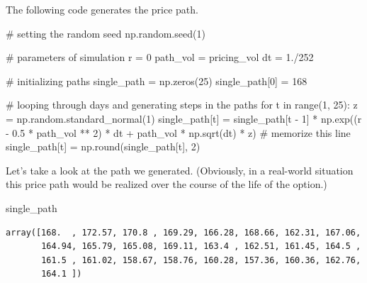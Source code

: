 \documentclass[
  letterpaper,
  DIV=11,
  numbers=noendperiod]{scrreprt}
\newenvironment{Shaded}{\begin{snugshade}}{\end{snugshade}}
\newcommand{\BuiltInTok}[1]{\textcolor[rgb]{0.00,0.23,0.31}{#1}}
\newcommand{\CommentTok}[1]{\textcolor[rgb]{0.37,0.37,0.37}{#1}}
\newcommand{\ControlFlowTok}[1]{\textcolor[rgb]{0.00,0.23,0.31}{#1}}
\newcommand{\DecValTok}[1]{\textcolor[rgb]{0.68,0.00,0.00}{#1}}
\newcommand{\FloatTok}[1]{\textcolor[rgb]{0.68,0.00,0.00}{#1}}
\newcommand{\KeywordTok}[1]{\textcolor[rgb]{0.00,0.23,0.31}{#1}}
\newcommand{\NormalTok}[1]{\textcolor[rgb]{0.00,0.23,0.31}{#1}}
\newcommand{\OperatorTok}[1]{\textcolor[rgb]{0.37,0.37,0.37}{#1}}
\begin{document}
The following code generates the price path.

\begin{Shaded}
\begin{Highlighting}[]
\CommentTok{\# setting the random seed}
\NormalTok{np.random.seed(}\DecValTok{1}\NormalTok{)}

\CommentTok{\# parameters of simulation}
\NormalTok{r }\OperatorTok{=} \DecValTok{0}
\NormalTok{path\_vol }\OperatorTok{=}\NormalTok{ pricing\_vol}
\NormalTok{dt }\OperatorTok{=} \FloatTok{1.}\OperatorTok{/}\DecValTok{252}

\CommentTok{\# initializing paths}
\NormalTok{single\_path }\OperatorTok{=}\NormalTok{ np.zeros(}\DecValTok{25}\NormalTok{)}
\NormalTok{single\_path[}\DecValTok{0}\NormalTok{] }\OperatorTok{=} \DecValTok{168}

\CommentTok{\# looping through days and generating steps in the paths}
\ControlFlowTok{for}\NormalTok{ t }\KeywordTok{in} \BuiltInTok{range}\NormalTok{(}\DecValTok{1}\NormalTok{, }\DecValTok{25}\NormalTok{):}
\NormalTok{    z }\OperatorTok{=}\NormalTok{ np.random.standard\_normal(}\DecValTok{1}\NormalTok{)}
\NormalTok{    single\_path[t] }\OperatorTok{=}\NormalTok{ single\_path[t }\OperatorTok{{-}} \DecValTok{1}\NormalTok{] }\OperatorTok{*}\NormalTok{ np.exp((r }\OperatorTok{{-}} \FloatTok{0.5} \OperatorTok{*}\NormalTok{ path\_vol }\OperatorTok{**} \DecValTok{2}\NormalTok{) }\OperatorTok{*}\NormalTok{ dt }\OperatorTok{+}\NormalTok{ path\_vol }\OperatorTok{*}\NormalTok{ np.sqrt(dt) }\OperatorTok{*}\NormalTok{ z) }\CommentTok{\# memorize this line}
\NormalTok{    single\_path[t] }\OperatorTok{=}\NormalTok{ np.}\BuiltInTok{round}\NormalTok{(single\_path[t], }\DecValTok{2}\NormalTok{)}
\end{Highlighting}
\end{Shaded}

Let's take a look at the path we generated. (Obviously, in a real-world
situation this price path would be realized over the course of the life
of the option.)

\begin{Shaded}
\begin{Highlighting}[]
\NormalTok{single\_path}
\end{Highlighting}
\end{Shaded}

\begin{verbatim}
array([168.  , 172.57, 170.8 , 169.29, 166.28, 168.66, 162.31, 167.06,
       164.94, 165.79, 165.08, 169.11, 163.4 , 162.51, 161.45, 164.5 ,
       161.5 , 161.02, 158.67, 158.76, 160.28, 157.36, 160.36, 162.76,
       164.1 ])
\end{verbatim}
\end{document}
